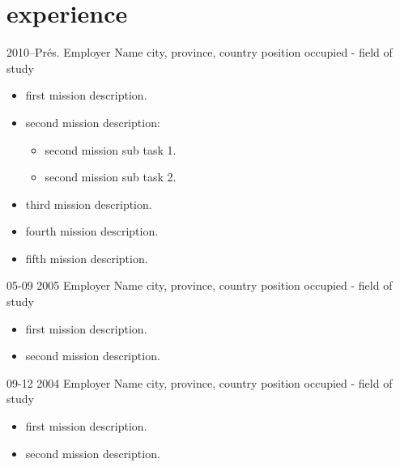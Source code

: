 \documentclass[print]{friggos-cv} %
\begin{document}

\section{experience}

\begin{entrylist}
  \entryBul
    {2010--Prés.}
    {Employer Name}
    {city, province, country}
    {position occupied - field of study}
    {
     \begin{itemize}[leftmargin=*]
       \setlength\itemsep{0pt}
       \item first mission description.                     
       \item second mission description:
         \begin{itemize}[leftmargin=0.5cm]
           \item second mission sub task 1.
           \item second mission sub task 2.
         \end{itemize}
       \item third mission description.
       \item fourth mission description.
       \item fifth mission description.
     \end{itemize}
     }
\end{entrylist}
\begin{entrylist}
  \entryBul
    {05-09 2005}
    {Employer Name}
    {city, province, country}
    {position occupied - field of study}
    {
     \begin{itemize}[leftmargin=*]
       \setlength\itemsep{0pt}
       \item first mission description.
       \item second mission description.
     \end{itemize}
     }
\end{entrylist}
\begin{entrylist}
  \entryBul
    {09-12 2004}
    {Employer Name}
    {city, province, country}
    {position occupied - field of study}
    {
     \begin{itemize}[leftmargin=*]
       \setlength\itemsep{0pt}
       \item first mission description.
       \item second mission description.
     \end{itemize}
     }
\end{entrylist}
\end{document}

